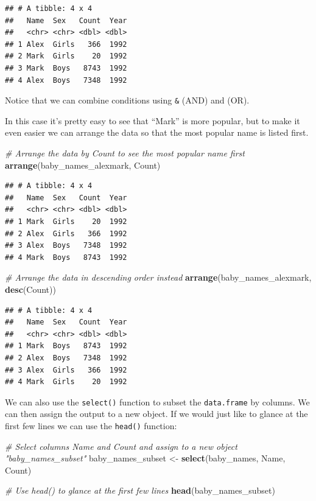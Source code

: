 \documentclass[
]{book}
\newenvironment{Shaded}{\begin{snugshade}}{\end{snugshade}}
\newcommand{\CommentTok}[1]{\textcolor[rgb]{0.56,0.35,0.01}{\textit{#1}}}
\newcommand{\KeywordTok}[1]{\textcolor[rgb]{0.13,0.29,0.53}{\textbf{#1}}}
\newcommand{\NormalTok}[1]{#1}
\newcommand{\StringTok}[1]{\textcolor[rgb]{0.31,0.60,0.02}{#1}}
\begin{document}
\begin{verbatim}
## # A tibble: 4 x 4
##   Name  Sex   Count  Year
##   <chr> <chr> <dbl> <dbl>
## 1 Alex  Girls   366  1992
## 2 Mark  Girls    20  1992
## 3 Mark  Boys   8743  1992
## 4 Alex  Boys   7348  1992
\end{verbatim}

Notice that we can combine conditions using \texttt{\&} (AND)
and \texttt{\textbar{}} (OR).

In this case it's pretty easy to see that ``Mark'' is more popular,
but to make it even easier we can arrange the data so that the
most popular name is listed first.

\begin{Shaded}
\begin{Highlighting}[]
\CommentTok{\# Arrange the data by Count to see the most popular name first}
\KeywordTok{arrange}\NormalTok{(baby\_names\_alexmark, Count)}
\end{Highlighting}
\end{Shaded}

\begin{verbatim}
## # A tibble: 4 x 4
##   Name  Sex   Count  Year
##   <chr> <chr> <dbl> <dbl>
## 1 Mark  Girls    20  1992
## 2 Alex  Girls   366  1992
## 3 Alex  Boys   7348  1992
## 4 Mark  Boys   8743  1992
\end{verbatim}

\begin{Shaded}
\begin{Highlighting}[]
\CommentTok{\# Arrange the data in descending order instead}
\KeywordTok{arrange}\NormalTok{(baby\_names\_alexmark, }\KeywordTok{desc}\NormalTok{(Count))}
\end{Highlighting}
\end{Shaded}

\begin{verbatim}
## # A tibble: 4 x 4
##   Name  Sex   Count  Year
##   <chr> <chr> <dbl> <dbl>
## 1 Mark  Boys   8743  1992
## 2 Alex  Boys   7348  1992
## 3 Alex  Girls   366  1992
## 4 Mark  Girls    20  1992
\end{verbatim}

We can also use the \texttt{select()} function to subset the \texttt{data.frame}
by columns. We can then assign the output to a new object. If we
would just like to glance at the first few lines we can use the
\texttt{head()} function:

\begin{Shaded}
\begin{Highlighting}[]
\CommentTok{\# Select columns Name and Count and assign to a new object "baby\_names\_subset"}
\NormalTok{baby\_names\_subset \textless{}{-}}\StringTok{ }\KeywordTok{select}\NormalTok{(baby\_names, Name, Count)}

\CommentTok{\# Use head() to glance at the first few lines}
\KeywordTok{head}\NormalTok{(baby\_names\_subset)}
\end{Highlighting}
\end{Shaded}
\end{document}

